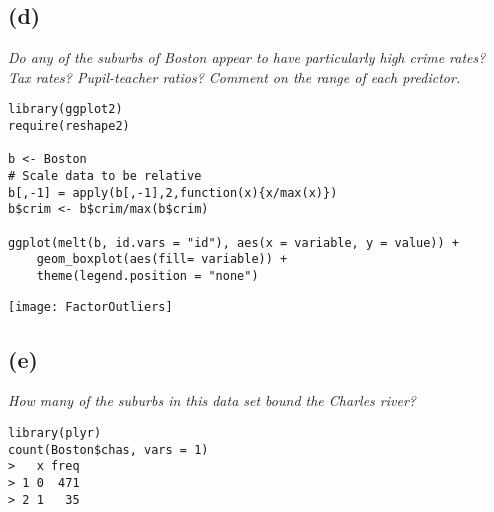 \documentclass[a4paper,man,natbib]{apa6}
\begin{document}
\subsection{(d)}
\emph{Do any of the suburbs of Boston appear to have particularly
high crime rates? Tax rates? Pupil-teacher ratios? Comment on
the range of each predictor.}
\begin{verbatim}
library(ggplot2)
require(reshape2)

b <- Boston
# Scale data to be relative
b[,-1] = apply(b[,-1],2,function(x){x/max(x)})
b$crim <- b$crim/max(b$crim)

ggplot(melt(b, id.vars = "id"), aes(x = variable, y = value)) +
	geom_boxplot(aes(fill= variable)) +
	theme(legend.position = "none") 
\end{verbatim}

\texttt{[image: FactorOutliers]}

\subsection{(e)}
\emph{How many of the suburbs in this data set bound the Charles
river?}
\begin{verbatim}
library(plyr)
count(Boston$chas, vars = 1)
>   x freq
> 1 0  471
> 2 1   35
\end{verbatim}
\end{document}
